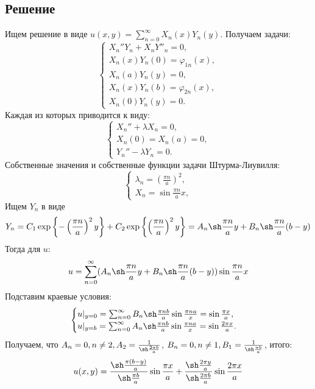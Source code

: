 \documentclass[11pt]{article}
\begin{document}
\subsection{Решение}
\label{sec:orgc60cb27}
Ищем решение в виде $u(x, y) = \sum_{n = 0}^{\infty}X_n(x)Y_n(y)$. Получаем задачи:
\begin{equation}
\begin{cases}
X_n''Y_n + X_nY''_n = 0, \\
X_n(x)Y_n(0) = \varphi_{1n}(x), \\
X_n(a)Y_n(y) = 0, \\
X_n(x)Y_n(b) = \varphi_{2n}(x), \\
X_n(0)Y_n(y) = 0.
\end{cases}
\end{equation}
Каждая из которых приводится к виду:
\begin{equation*}
\begin{cases}
X_n'' + \lambda X_n = 0, \\
X_n(0) = X_n(a) = 0, \\
Y_n'' - \lambda Y_n = 0.
\end{cases}
\end{equation*}
Собственные значения и собственные функции задачи Штурма-Лиувилля:
\begin{equation*}
\begin{cases}
\lambda_n = \left(\frac{\pi n}a\right)^2, \\
X_n = \sin\frac{\pi n}ax,
\end{cases}
\end{equation*}
Ищем $Y_n$ в виде
\begin{equation*}
Y_n = C_1\exp\left\{-\left(\frac{\pi n}a\right)^2y\right\} + C_2\exp\left\{\left(\frac{\pi n}a\right)^2y\right\}
= A_n\sh\frac{\pi n}ay + B_n\sh\frac{\pi n}a(b - y)
\end{equation*}
Тогда для $u$:
\begin{equation*}
u = \sum_{n = 0}^{\infty}(A_n\sh\frac{\pi n}ay + B_n\sh\frac{\pi n}a(b - y))\sin\frac{\pi n}ax
\end{equation*}
Подставим краевые условия:
\begin{equation*}
\begin{cases}
u|_{y = 0} = \sum_{n = 0}^{\infty}B_n\sh\frac{\pi n b}a\sin\frac{\pi n a}x = \sin\frac{\pi x}a, \\
u|_{y = b} = \sum_{n = 0}^{\infty}A_n\sh\frac{\pi n b}a\sin\frac{\pi n a}x = \sin\frac{2\pi x}a.
\end{cases}
\end{equation*}
Получаем, что $A_n = 0, n \neq 2, A_2 = \frac1{\sh\frac{2\pi b}a}$, $B_n = 0, n \neq 1, B_1 = \frac1{\sh\frac{\pi b}a}$, итого:
\begin{equation}
u(x, y) = \frac{\sh\frac{\pi(b - y)}a}{\sh\frac{\pi b}a}\sin\frac{\pi x}a +
\frac{\sh\frac{2\pi y}a}{\sh\frac{2\pi b}a}\sin\frac{2\pi x}a
\end{equation}
\end{document}
